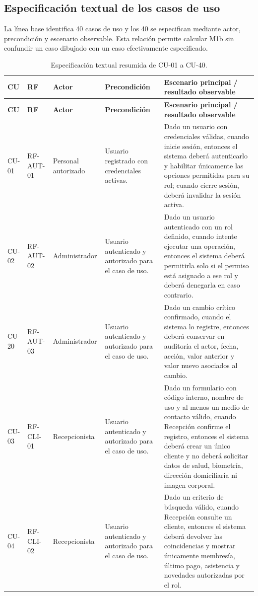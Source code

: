 
\subsection{Especificación textual de los casos de uso}
La línea base identifica 40 casos de uso y los 40 se especifican mediante actor, precondición y escenario observable. Esta relación permite calcular M1b sin confundir un caso dibujado con un caso efectivamente especificado.

\begin{landscape}
\scriptsize
\begin{longtable}{|p{1.2cm}|p{1.9cm}|p{2.4cm}|p{5.0cm}|p{9.2cm}|}
\caption{Especificación textual resumida de CU-01 a CU-40.}\\
\hline\textbf{CU} & \textbf{RF} & \textbf{Actor} & \textbf{Precondición} & \textbf{Escenario principal / resultado observable}\\\hline
\endfirsthead
\hline\textbf{CU} & \textbf{RF} & \textbf{Actor} & \textbf{Precondición} & \textbf{Escenario principal / resultado observable}\\\hline
\endhead
CU-01 & RF-AUT-01 & Personal autorizado & Usuario registrado con credenciales activas. & Dado un usuario con credenciales válidas, cuando inicie sesión, entonces el sistema deberá autenticarlo y habilitar únicamente las opciones permitidas para su rol; cuando cierre sesión, deberá invalidar la sesión activa. \\ \hline
CU-02 & RF-AUT-02 & Administrador & Usuario autenticado y autorizado para el caso de uso. & Dado un usuario autenticado con un rol definido, cuando intente ejecutar una operación, entonces el sistema deberá permitirla solo si el permiso está asignado a ese rol y deberá denegarla en caso contrario. \\ \hline
CU-20 & RF-AUT-03 & Administrador & Usuario autenticado y autorizado para el caso de uso. & Dado un cambio crítico confirmado, cuando el sistema lo registre, entonces deberá conservar en auditoría el actor, fecha, acción, valor anterior y valor nuevo asociados al cambio. \\ \hline
CU-03 & RF-CLI-01 & Recepcionista & Usuario autenticado y autorizado para el caso de uso. & Dado un formulario con código interno, nombre de uso y al menos un medio de contacto válido, cuando Recepción confirme el registro, entonces el sistema deberá crear un único cliente y no deberá solicitar datos de salud, biometría, dirección domiciliaria ni imagen corporal. \\ \hline
CU-04 & RF-CLI-02 & Recepcionista & Usuario autenticado y autorizado para el caso de uso. & Dado un criterio de búsqueda válido, cuando Recepción consulte un cliente, entonces el sistema deberá devolver las coincidencias y mostrar únicamente membresía, último pago, asistencia y novedades autorizadas por el rol. \\ \hline

\end{longtable}
\end{landscape}
